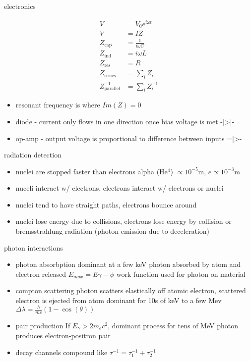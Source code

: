 \documentclass[avery5388, frame]{flashcards}
\begin{document}
\begin{flashcard}{electronics}
  {
    \begin{align*}
      V &= V_{0}e^{i \omega t}\\
      V &= I Z\\
      Z_{\textrm{cap}} &= \frac{1}{i \omega C}\\
      Z_{\textrm{ind}} &= i \omega L\\
      Z_{\textrm{res}} &= R\\
      Z_{\textrm{series}} &= \sum_{i} Z_{i}\\
      Z_{\textrm{parallel}}^{-1} &= \sum_{i} Z_{i}^{-1}
    \end{align*}

    \begin{itemize}
    \item resonant frequency is where $Im(Z) = 0$
    \item diode - current only flows in one direction once bias voltage is met -|>|-
    \item op-amp - output voltage is proportional to difference between inputs =|>-
    \end{itemize}
  }
\end{flashcard}

\begin{flashcard}{radiation detection}
  {
    \begin{itemize}
    \item nuclei are stopped faster than electrons alpha (He$^{4}$) $\propto 10^{-5}$m, $e \propto 10^{-3}$m
    \item nuceli interact w/ electrons. electrons interact w/ electrons or nuclei
    \item nuclei tend to have straight paths, electrons bounce around
    \item nuclei lose energy due to collisions, electrons lose energy by collision or bremsstrahlung radiation (photon emission due to deceleration)
    \end{itemize}
  }
\end{flashcard}

\begin{flashcard}{photon interactions}
  {
    \begin{itemize}
    \item photon absorbption
      \subitem dominant at a few keV
      \subitem photon absorbed by atom and electron released
      \subitem $E_{max} = E \gamma - \phi$ work function used for photon on material
    \item compton scattering
      \subitem photon scatters elastically off atomic electron, scattered electron is ejected from atom
      \subitem dominant for 10s of keV to a few Mev
      \subitem $\Delta \lambda = \frac{h}{mc}(1 - \cos(\theta))$
    \item pair production
      \subitem If $E_{\gamma} > 2m_{e}c^{2}$, dominant process for tens of MeV
      \subitem photon produces electron-positron pair
    \item decay channels compound like $\tau^{-1} = \tau^{-1}_{1} + \tau^{-1}_{2}$
    \end{itemize}
  }
\end{flashcard}
\end{document}
